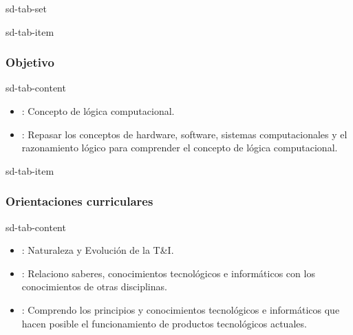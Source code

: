 \documentclass[letterpaper,10pt,spanish]{sphinxmanual}
\begin{document}
\begin{sphinxuseclass}{sd-tab-set}
\begin{sphinxuseclass}{sd-tab-item}\subsubsection*{Objetivo}

\begin{sphinxuseclass}{sd-tab-content}
\sphinxAtStartPar
{}
\begin{itemize}
\item {} 
\sphinxAtStartPar
{}: Concepto de lógica computacional.

\item {} 
\sphinxAtStartPar
{}: Repasar los conceptos de hardware, software, sistemas computacionales y el razonamiento lógico para comprender el concepto de lógica computacional.

\end{itemize}

\end{sphinxuseclass}
\end{sphinxuseclass}
\begin{sphinxuseclass}{sd-tab-item}\subsubsection*{Orientaciones curriculares}

\begin{sphinxuseclass}{sd-tab-content}\begin{itemize}
\item {} 
\sphinxAtStartPar
{}: Naturaleza y Evolución de la T\&I.

\item {} 
\sphinxAtStartPar
{}: Relaciono saberes, conocimientos tecnológicos e informáticos con los conocimientos de otras disciplinas.

\item {} 
\sphinxAtStartPar
{}: Comprendo los principios y conocimientos tecnológicos e informáticos que hacen posible el funcionamiento de productos tecnológicos actuales.


\end{itemize}
\end{sphinxuseclass}
\end{sphinxuseclass}
\end{sphinxuseclass}
\end{document}
